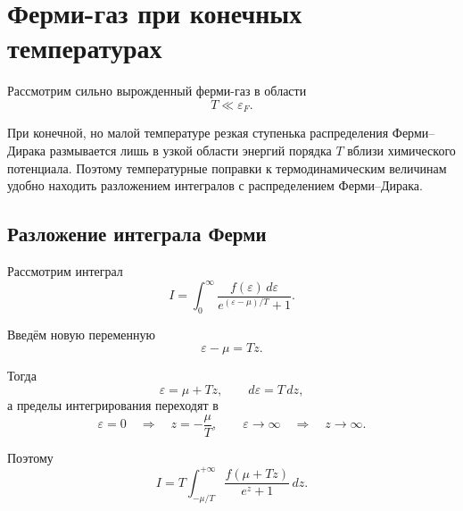 \documentclass[../final.tex]{subfiles}
\begin{document}
\ifSubfilesClassLoaded{\setcounter{chapter}{1}\setcounter{section}{7}}{}


\section{Ферми-газ при конечных температурах}

Рассмотрим сильно вырожденный ферми-газ в области
%
\begin{equation*}
    T
    \ll
    \varepsilon_F.
\end{equation*}

При конечной, но малой температуре резкая ступенька распределения
Ферми--Дирака размывается лишь в узкой области энергий порядка $T$
вблизи химического потенциала. Поэтому температурные поправки
к термодинамическим величинам удобно находить разложением
интегралов с распределением Ферми--Дирака.


\subsection{Разложение интеграла Ферми}

Рассмотрим интеграл
%
\begin{equation*}
    I
    =
    \int_0^\infty
    \frac{
        f(\varepsilon)\,d\varepsilon
    }{
        e^{(\varepsilon-\mu)/T}+1
    }.
\end{equation*}

Введём новую переменную
%
\begin{equation*}
    \varepsilon-\mu
    =
    Tz.
\end{equation*}

Тогда
%
\begin{equation*}
    \varepsilon
    =
    \mu+Tz,
    \qquad
    d\varepsilon
    =
    T\,dz,
\end{equation*}
%
а пределы интегрирования переходят в
%
\begin{equation*}
    \varepsilon=0
    \quad\Longrightarrow\quad
    z=-\frac{\mu}{T},
    \qquad
    \varepsilon\rightarrow\infty
    \quad\Longrightarrow\quad
    z\rightarrow\infty.
\end{equation*}

Поэтому
%
\begin{equation*}
    I
    =
    T
    \int_{-\mu/T}^{+\infty}
    \frac{
        f(\mu+Tz)
    }{
        e^z+1
    }
    \,dz.
\end{equation*}
\end{document}
